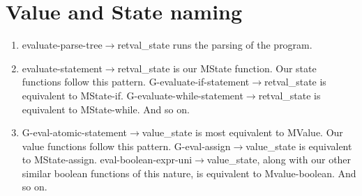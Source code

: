\documentclass{article}
\begin{document}
\section{Value and State naming}
\begin{enumerate}
    \item evaluate-parse-tree$\rightarrow$retval\_state runs the parsing of the program. 
    
    \item evaluate-statement$\rightarrow$retval\_state is our MState function. Our state functions follow this pattern. G-evaluate-if-statement$\rightarrow$retval\_state is equivalent to MState-if. G-evaluate-while-statement$\rightarrow$retval\_state is equivalent to MState-while. And so on.
    
    \item G-eval-atomic-statement$\rightarrow$value\_state is most equivalent to MValue. Our value functions follow this pattern. G-eval-assign$\rightarrow$value\_state is equivalent to MState-assign. eval-boolean-expr-uni$\rightarrow$value\_state, along with our other similar boolean functions of this nature, is equivalent to Mvalue-boolean. And so on.
\end{enumerate}
\end{document}
